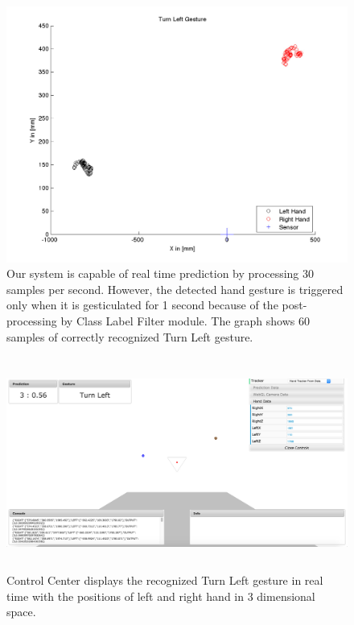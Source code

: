 \begin{figure}
	[h] \hspace{-15 mm} \centering 
	\includegraphics[width=155mm]{figures/result/test-turn-left.jpg} \caption{ Our system is capable of real time prediction by processing 30 samples per second. However, the detected hand gesture is triggered only when it is gesticulated for 1 second because of the post-processing by Class Label Filter module. The graph shows 60 samples of correctly recognized Turn Left gesture. }\label{res:pl:turn:left} 
\end{figure}
\begin{figure}
	[h] \centering 
	\includegraphics[height=70mm]{figures/result/cc-turn-left.jpg} \caption{Control Center displays the recognized Turn Left gesture in real time with the positions of left and right hand in 3 dimensional space.}
	
	\label{res:cc:turn:left} 
\end{figure}
